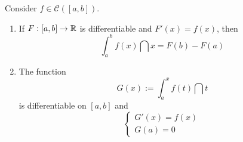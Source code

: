 \begin{theorem}
    Consider $f \in \mathcal{C}([a,b])$.
    \begin{enumerate}
        \item If $F:[a,b] \to \mathbb{R}$ is differentiable and $F'(x) = f(x)$, then
            \begin{equation*}
                \int_a^b f(x) \dint x = F(b) - F(a)
            \end{equation*}
        \item The function 
            \begin{equation*}
                G(x) := \int_a^x f(t) \dint t
            \end{equation*}
            is differentiable on $[a,b]$ and
            \begin{equation*}
                \begin{cases}
                    G'(x) = f(x) \\
                    G(a) = 0
                \end{cases}
            \end{equation*} 
    \end{enumerate}
\end{theorem}

